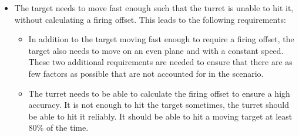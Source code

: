 \begin{itemize}
\begin{itemize}
  \end{itemize}  
  \item The target needs to move fast enough such that the turret is unable to
  hit it, without calculating a firing offset. This leads to the following
  requirements:
  \begin{itemize}
    \item In addition to the target moving fast enough to require a firing
    offset, the target also needs to move on an even plane and with a constant
    speed. These two additional requirements are needed to ensure that there are
    as few factors as possible that are not accounted for in the scenario.
    \item The turret needs to be able to calculate the firing offset to ensure
    a high accuracy. It is not enough to hit the target sometimes, the turret
    should be able to hit it reliably. It should be able to hit a moving target
    at least 80\% of the time.
  
  \end{itemize}
  \end{itemize}
  
